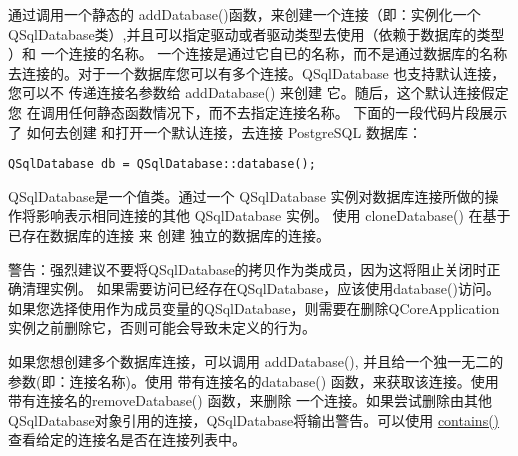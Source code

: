 通过调用一个静态的 addDatabase()函数，来创建一个连接（即：实例化一个QSqlDatabase类）,并且可以指定驱动或者驱动类型去使用（依赖于数据库的类型 ）和 一个连接的名称。 一个连接是通过它自已的名称，而不是通过数据库的名称去连接的。对于一个数据库您可以有多个连接。QSqlDatabase 也支持默认连接，您可以不 传递连接名参数给 addDatabase() 来创建 它。随后，这个默认连接假定您 在调用任何静态函数情况下，而不去指定连接名称。 下面的一段代码片段展示了 如何去创建 和打开一个默认连接，去连接 PostgreSQL 数据库：

\begin{lstlisting}
QSqlDatabase db = QSqlDatabase::database();
\end{lstlisting}

QSqlDatabase是一个值类。通过一个 QSqlDatabase 实例对数据库连接所做的操作将影响表示相同连接的其他 QSqlDatabase 实例。 使用 cloneDatabase() 在基于已存在数据库的连接 来 创建 独立的数据库的连接。

警告：强烈建议不要将QSqlDatabase的拷贝作为类成员，因为这将阻止关闭时正确清理实例。 如果需要访问已经存在QSqlDatabase，应该使用database()访问。如果您选择使用作为成员变量的QSqlDatabase，则需要在删除QCoreApplication实例之前删除它，否则可能会导致未定义的行为。

如果您想创建多个数据库连接，可以调用 addDatabase(), 并且给一个独一无二的参数(即：连接名称)。使用 带有连接名的database() 函数，来获取该连接。使用 带有连接名的removeDatabase() 函数，来删除 一个连接。如果尝试删除由其他QSqlDatabase对象引用的连接，QSqlDatabase将输出警告。可以使用 \href{https://github.com/QtDocumentCN/QtDocumentCN/blob/master/Src/S/QSqlDatabase/QSqlDatabase.md#static-bool-qsqldatabasecontainsconst-qstring-connectionname--qlatin1stringdefaultconnection}{contains()}查看给定的连接名是否在连接列表中。



